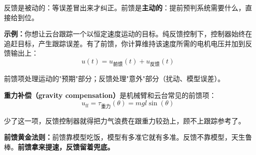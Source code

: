 反馈是被动的：等误差冒出来才纠正。前馈是\textbf{主动的}：提前预判系统需要什么，直接给到位。

\textbf{示例：}你想让云台跟踪一个以恒定速度运动的目标。纯反馈控制下，控制器始终在追赶目标，产生跟踪误差。有了前馈，你计算维持该速度所需的电机电压并加到反馈输出上：
\begin{equation}
u(t) = u_{\text{前馈}}(t) + u_{\text{反馈}}(t)
\end{equation}

前馈项处理运动的"预期"部分；反馈处理"意外"部分（扰动、模型误差）。

\textbf{重力补偿（gravity compensation）}是机械臂和云台常见的前馈项：
\begin{equation}
u_{\text{ff}} = \tau_{\text{重力}}(\theta) = mgl\sin(\theta)
\end{equation}

少了这一项，反馈控制器就得把力气浪费在跟重力较劲上，顾不上跟踪参考了。

\textbf{前馈黄金法则：}前馈靠模型吃饭，模型有多准它就有多准。反馈不靠模型，天生鲁棒。\textbf{前馈拿来提速，反馈留着兜底。}

